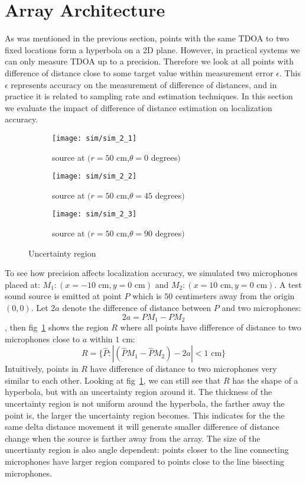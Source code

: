 \section{Array Architecture}
As was mentioned in the previous section, points with the same TDOA to two fixed locations form a hyperbola on a 2D plane. However, in practical systems we can only measure TDOA up to a precision. Therefore we look at all points with difference of distance close to some target value within measurement error $\epsilon$. This $\epsilon$ represents accuracy on the measurement of difference of distances, and in practice it is related to sampling rate and estimation techniques. In this section we evaluate the impact of difference of distance estimation on localization accuracy.

\begin{figure}[]
  \centering
  \begin{subfigure}[]{.23\textwidth}
    \texttt{[image: sim/sim\_2\_1]}
    \caption{source at $(r=50$ cm,$\theta = 0$ degrees$)$}
  \end{subfigure}
  \begin{subfigure}[]{.23\textwidth}
    \texttt{[image: sim/sim\_2\_2]}
    \caption{source at $(r=50$ cm,$\theta = 45$ degrees$)$}
  \end{subfigure}
  \begin{subfigure}[]{.23\textwidth}
    \texttt{[image: sim/sim\_2\_3]}
    \caption{source at $(r=50$ cm,$\theta = 90$ degrees$)$}
  \end{subfigure}
  \caption{Uncertainty region}
  \label{fig:sim_2_5}
\end{figure}

To see how precision affects localization accuracy, we simulated two microphones placed at: $M_1:(x=-10\mbox{ cm},y=0\mbox{ cm})$ and $M_2:(x=10\mbox{ cm},y=0\mbox{ cm})$. A test sound source is emitted at point $P$ which is $50$ centimeters away from the origin $(0,0)$. Let $2a$ denote the difference of distance between $P$ and two microphones:
\[
2a = P M_1 - P M_2 
\]
, then fig~\ref{fig:sim_2_5} shows the region $R$ where all points have difference of distance to two microphones close to $a$ within $1$ cm:
\[
R=\{\hat P: |(\hat P M_1 - \hat P M_2) - 2a|< 1 \mbox{ cm}\}
\]
Intuitively, points in $R$ have difference of distance to two microphones very similar to each other. Looking at fig~\ref{fig:sim_2_5}, we can still see that $R$ has the shape of a hyperbola, but with an uncertainty region around it. The thickness of the uncertainty region is not uniform around the hyperbola, the farther away the point is, the larger the uncertainty region becomes. This indicates for the the same delta distance movement it will generate smaller difference of distance change when the source is farther away from the array. The size of the uncertianty region is also angle dependent: points closer to the line connecting microphones have larger region compared to points close to the line bisecting microphones. 

